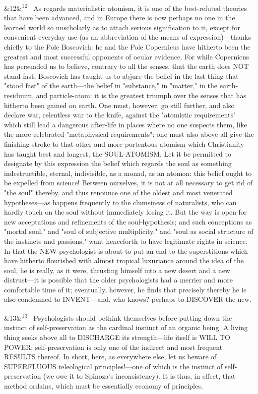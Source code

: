 \documentclass[12pt]{article}
\newcommand{\para}[1][]{\par\noindent\ifx&#1&\else\textsuperscript{\footnotesize #1}~\fi}
\begin{document}
\para[12] As regards materialistic atomism, it is one of the best-refuted theories that have been advanced, and in Europe there is now perhaps no one in the learned world so unscholarly as to attach serious signification to it, except for convenient everyday use (as an abbreviation of the means of expression)---thanks chiefly to the Pole Boscovich: he and the Pole Copernicus have hitherto been the greatest and most successful opponents of ocular evidence. For while Copernicus has persuaded us to believe, contrary to all the senses, that the earth does NOT stand fast, Boscovich has taught us to abjure the belief in the last thing that "stood fast" of the earth---the belief in "substance," in "matter," in the earth-residuum, and particle-atom: it is the greatest triumph over the senses that has hitherto been gained on earth. One must, however, go still further, and also declare war, relentless war to the knife, against the "atomistic requirements" which still lead a dangerous after-life in places where no one suspects them, like the more celebrated "metaphysical requirements": one must also above all give the finishing stroke to that other and more portentous atomism which Christianity has taught best and longest, the SOUL-ATOMISM. Let it be permitted to designate by this expression the belief which regards the soul as something indestructible, eternal, indivisible, as a monad, as an atomon: this belief ought to be expelled from science! Between ourselves, it is not at all necessary to get rid of "the soul" thereby, and thus renounce one of the oldest and most venerated hypotheses---as happens frequently to the clumsiness of naturalists, who can hardly touch on the soul without immediately losing it. But the way is open for new acceptations and refinements of the soul-hypothesis; and such conceptions as "mortal soul," and "soul of subjective multiplicity," and "soul as social structure of the instincts and passions," want henceforth to have legitimate rights in science. In that the NEW psychologist is about to put an end to the superstitions which have hitherto flourished with almost tropical luxuriance around the idea of the soul, he is really, as it were, thrusting himself into a new desert and a new distrust---it is possible that the older psychologists had a merrier and more comfortable time of it; eventually, however, he finds that precisely thereby he is also condemned to INVENT---and, who knows? perhaps to DISCOVER the new.

\para[13] Psychologists should bethink themselves before putting down the instinct of self-preservation as the cardinal instinct of an organic being. A living thing seeks above all to DISCHARGE its strength---life itself is WILL TO POWER; self-preservation is only one of the indirect and most frequent RESULTS thereof. In short, here, as everywhere else, let us beware of SUPERFLUOUS teleological principles!---one of which is the instinct of self-preservation (we owe it to Spinoza's inconsistency). It is thus, in effect, that method ordains, which must be essentially economy of principles.
\end{document}
